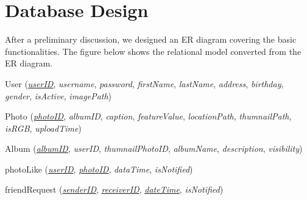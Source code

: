 \documentclass[a4paper,12pt]{article}
\begin{document}
\section*{Database Design}
After a preliminary discussion, we designed an ER diagram covering the basic functionalities. The figure below shows the relational model converted from the ER diagram.

User (\emph{\underline{userID}}, \emph{username}, \emph{password}, \emph{firstName}, \emph{lastName}, \emph{address}, \emph{birthday}, \emph{gender}, \emph{isActive}, \emph{imagePath})

Photo (\emph{\underline{photoID}}, \emph{albumID}, \emph{caption}, \emph{featureValue}, \emph{locationPath}, \emph{thumnailPath}, \emph{isRGB}, \emph{uploadTime})

Album (\emph{\underline{albumID}}, \emph{userID}, \emph{thumnailPhotoID}, \emph{albumName}, \emph{description}, \emph{visibility})

photoLike (\emph{\underline{userID}}, \emph{\underline{photoID}}, \emph{dataTime}, \emph{isNotified})

friendRequest (\emph{\underline{senderID}}, \emph{\underline{receiverID}}, \emph{\underline{dateTime}}, \emph{isNotified})
\end{document}
